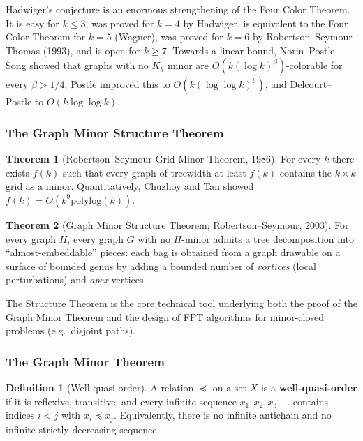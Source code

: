 \documentclass{article}
\theoremstyle{definition}
\newtheorem{theorem}{Theorem}
\newtheorem{definition}{Definition}
\begin{document}
Hadwiger's conjecture is an enormous strengthening of the Four Color
Theorem. It is easy for $k \le 3$, was proved for $k = 4$ by Hadwiger,
is equivalent to the Four Color Theorem for $k = 5$ (Wagner), was proved
for $k = 6$ by Robertson--Seymour--Thomas (1993), and is open for $k \ge 7$.
Towards a linear bound, Norin--Postle--Song showed that graphs with no
$K_k$ minor are $O(k (\log k)^{\beta})$-colorable for every $\beta > 1/4$;
Postle improved this to $O(k (\log \log k)^6)$, and Delcourt--Postle to
$O(k \log \log k)$.

\subsubsection{The Graph Minor Structure Theorem}

\begin{theorem}[Robertson--Seymour Grid Minor Theorem, 1986]\label{thm:gridminor}
For every $k$ there exists $f(k)$ such that every graph of treewidth
at least $f(k)$ contains the $k \times k$ grid as a minor.
Quantitatively, Chuzhoy and Tan showed $f(k) = O(k^9 \mathrm{polylog}(k))$.
\end{theorem}

\begin{theorem}[Graph Minor Structure Theorem; Robertson--Seymour, 2003]
For every graph $H$, every graph $G$ with no $H$-minor admits a
tree decomposition into ``almost-embeddable'' pieces: each bag is
obtained from a graph drawable on a surface of bounded genus by
adding a bounded number of \emph{vortices} (local perturbations) and
\emph{apex} vertices.
\end{theorem}

The Structure Theorem is the core technical tool underlying both the
proof of the Graph Minor Theorem and the design of FPT algorithms for
minor-closed problems (e.g.\ disjoint paths).

\subsubsection{The Graph Minor Theorem}

\begin{definition}[Well-quasi-order]
A relation $\preceq$ on a set $X$ is a \textbf{well-quasi-order} if
it is reflexive, transitive, and every infinite sequence
$x_1, x_2, x_3, \dots$ contains indices $i < j$ with $x_i \preceq x_j$.
Equivalently, there is no infinite antichain and no infinite strictly
decreasing sequence.
\end{definition}
\end{document}
